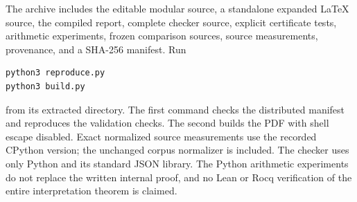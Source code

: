 \documentclass[11pt,letterpaper]{article}
\theoremstyle{definition}\newtheorem{definition}[theorem]{Definition}
\theoremstyle{remark}\newtheorem{remark}[theorem]{Remark}
\begin{document}
The archive includes the editable modular source, a standalone expanded
\LaTeX{} source, the compiled report, complete checker source, explicit
certificate tests, arithmetic experiments, frozen comparison sources,
source measurements, provenance, and a SHA-256 manifest. Run
\begin{lstlisting}
python3 reproduce.py
python3 build.py
\end{lstlisting}
from its extracted directory. The first command checks the distributed
manifest and reproduces the validation checks. The second builds the PDF
with shell escape disabled. Exact normalized source measurements use the
recorded CPython version; the unchanged corpus normalizer is included.
The checker uses only Python and its standard JSON library. The Python
arithmetic experiments do not replace the written internal proof, and no
Lean or Rocq verification of the entire interpretation theorem is claimed.

\appendix



\end{document}
